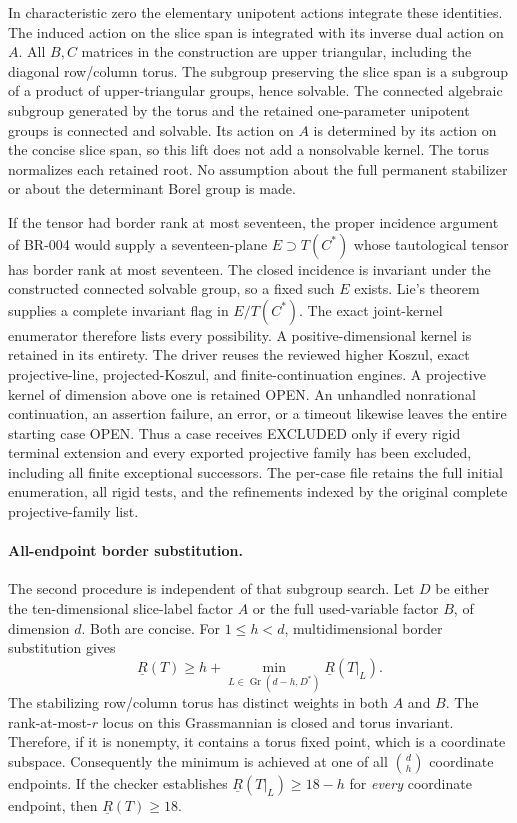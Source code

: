 In characteristic zero the elementary unipotent actions integrate
these identities.  The induced action on the slice span is integrated
with its inverse dual action on $A$.  All $B,C$ matrices in the
construction are upper triangular, including the diagonal row/column
torus.  The subgroup preserving the slice span is a subgroup of a
product of upper-triangular groups, hence solvable.  The connected
algebraic subgroup generated by the torus and the retained
one-parameter unipotent groups is connected and solvable.  Its action
on $A$ is determined by its action on the concise slice span, so this
lift does not add a nonsolvable kernel.  The torus normalizes each
retained root.  No assumption about the full permanent stabilizer
or about the determinant Borel group is made.

If the tensor had border rank at most seventeen, the proper incidence
argument of BR-004 would supply a seventeen-plane $E\supset T(C^*)$
whose tautological tensor has border rank at most seventeen.  The
closed incidence is invariant under the constructed connected solvable
group, so a fixed such $E$ exists.  Lie's theorem supplies a complete
invariant flag in $E/T(C^*)$.  The exact joint-kernel enumerator
therefore lists every possibility.  A positive-dimensional kernel
is retained in its entirety.  The driver reuses the reviewed higher
Koszul, exact projective-line, projected-Koszul, and finite-continuation
engines.  A projective kernel of dimension above one is retained OPEN.
An unhandled nonrational continuation, an assertion failure, an error,
or a timeout likewise leaves the entire starting case OPEN.  Thus a
case receives EXCLUDED only if every rigid terminal extension and
every exported projective family has been excluded, including all
finite exceptional successors.  The per-case file retains the full
initial enumeration, all rigid tests, and the refinements indexed by
the original complete projective-family list.

\paragraph{All-endpoint border substitution.}
The second procedure is independent of that subgroup search.  Let
$D$ be either the ten-dimensional slice-label factor $A$ or the full
used-variable factor $B$, of dimension $d$.  Both are concise.  For
$1\le h<d$, multidimensional border substitution gives
\[
 \underline R(T)\ge h+
 \min_{L\in\operatorname{Gr}(d-h,D^*)}
 \underline R(T|_L).
\]
The stabilizing row/column torus has distinct weights in both $A$ and
$B$.  The rank-at-most-$r$ locus on this Grassmannian is closed and
torus invariant.  Therefore, if it is nonempty, it contains a torus
fixed point, which is a coordinate subspace.  Consequently the
minimum is achieved at one of all $\binom dh$ coordinate endpoints.
If the checker establishes
$\underline R(T|_L)\ge18-h$ for \emph{every} coordinate endpoint,
then $\underline R(T)\ge18$.


